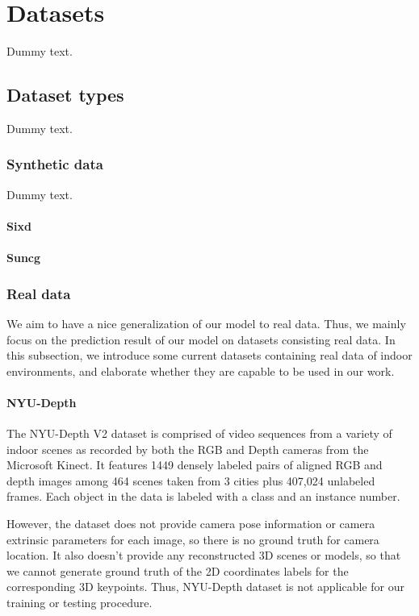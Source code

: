 \chapter{Datasets}

Dummy text.

\section{Dataset types}

Dummy text.

\subsection{Synthetic data}

Dummy text.
\subsubsection{Sixd}


\subsubsection{Suncg}


\subsection{Real data}
We aim to have a nice generalization of our model to real data. Thus, we mainly focus on the prediction result of our model on datasets consisting real data. In this subsection, we introduce some current datasets containing real data of indoor environments, and elaborate whether they are capable to be used in our work.

\subsubsection{NYU-Depth}
The NYU-Depth V2 dataset is comprised of video sequences from a variety of indoor scenes as recorded by both the RGB and Depth cameras from the Microsoft Kinect. It features 1449 densely labeled pairs of aligned RGB and depth images among 464 scenes taken from 3 cities plus 407,024 unlabeled frames. Each object in the data is labeled with a class and an instance number.

However, the dataset does not provide camera pose information or camera extrinsic parameters for each image, so there is no ground truth for camera location. It also doesn't provide any reconstructed 3D scenes or models, so that we cannot generate ground truth of the 2D coordinates labels for the corresponding 3D keypoints. Thus, NYU-Depth dataset is not applicable for our training or testing procedure.


